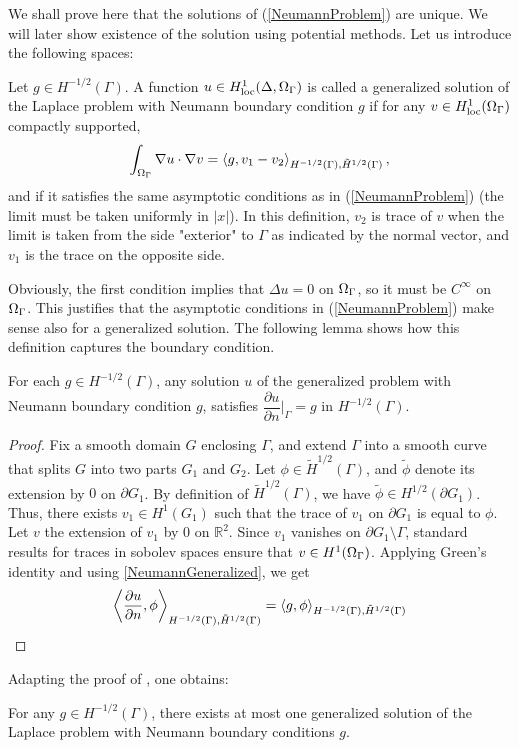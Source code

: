 \documentclass[10pt,a4paper]{article}
\begin{document}
We shall prove here that the solutions of (\ref{NeumannProblem}) are unique. We will later show existence of the solution using potential methods. Let us introduce the following spaces:
\begin{Def}
	Let $g \in H^{-1/2}(\Gamma)$. A function $u \in H^1_{\text{loc}}(\Delta,\Omega_\Gamma)$ is called a generalized solution of the Laplace problem with Neumann boundary condition $g$ if for any $v \in H^1_{\text{loc}}(\Omega_\Gamma)$ compactly supported, 
	\begin{equation}
		\int_{\Omega_\Gamma} \nabla u \cdot \nabla v = \left\langle g,v_1 - v_2\right\rangle_{H^{-1/2}(\Gamma),\tilde{H}^{1/2}(\Gamma)},
		\label{NeumannGeneralized}
	\end{equation}
	and if it satisfies the same asymptotic conditions as in (\ref{NeumannProblem}) (the limit must be taken uniformly in $|x|$). 
	In this definition, $v_2$ is trace of $v$ when the limit is taken from the side "exterior" to $\Gamma$ as indicated by the normal vector, and $v_1$ is the trace on the opposite side.\\
\end{Def}
Obviously, the first condition implies that $\Delta u = 0$ on $\Omega_\Gamma$, so it must be $C^{\infty}$ on $\Omega_\Gamma$. This justifies that the asymptotic conditions in (\ref{NeumannProblem}) make sense also for a generalized solution. 
The following lemma shows how this definition captures the boundary condition. 
\begin{Lem}
	For each $g \in H^{-1/2}(\Gamma)$, any solution $u$ of the generalized problem with Neumann boundary condition $g$, satisfies
	$\dfrac{\partial u}{\partial n}\Big|_{\Gamma} = g  \text{ in } H^{-1/2}(\Gamma)$.
	\begin{proof}
		Fix a smooth domain $G$ enclosing $\Gamma$, and extend $\Gamma$ into a smooth curve that splits $G$ into two parts $G_1$ and $G_2$. Let $\phi \in\tilde{H}^{1/2}(\Gamma)$, and $\tilde{\phi}$ denote its extension by $0$ on $\partial G_1$. By definition of $\tilde{H}^{1/2}(\Gamma)$, we have $\tilde{\phi} \in H^{1/2}(\partial G_1)$. Thus, there exists $v_1 \in H^{1}(G_1)$ such that the trace of $v_1$ on $\partial G_1$ is equal to $\phi$. Let $v$ the extension of $v_1$ by $0$ on $\mathbb{R}^2$. Since $v_1$ vanishes on $\partial G_1 \setminus \Gamma$, standard results for traces in sobolev spaces ensure that $v\in H^1(\Omega_\Gamma)$. Applying Green's identity and using \ref{NeumannGeneralized}, we get 
		\begin{equation}
			\left\langle \frac{\partial u}{\partial n},\phi\right\rangle_{H^{-1/2}(\Gamma),\tilde{H}^{1/2}(\Gamma)} = \left\langle g,\phi\right\rangle_{H^{-1/2}(\Gamma),\tilde{H}^{1/2}(\Gamma)}
		\end{equation}
	\end{proof}
\end{Lem}
Adapting the proof of \cite[The 4.1 p. 56]{wilcox1975scattering}, one obtains:
\begin{Lem}
	For any $g \in H^{-1/2}(\Gamma)$, there exists at most one generalized solution of the Laplace problem with Neumann boundary conditions $g$. 
\end{Lem}
\end{document}
